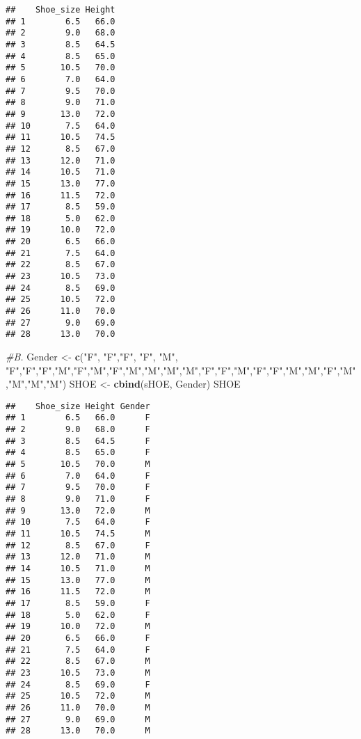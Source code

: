 \documentclass[
]{article}
\newenvironment{Shaded}{\begin{snugshade}}{\end{snugshade}}
\newcommand{\CommentTok}[1]{\textcolor[rgb]{0.56,0.35,0.01}{\textit{#1}}}
\newcommand{\FunctionTok}[1]{\textcolor[rgb]{0.13,0.29,0.53}{\textbf{#1}}}
\newcommand{\NormalTok}[1]{#1}
\newcommand{\OtherTok}[1]{\textcolor[rgb]{0.56,0.35,0.01}{#1}}
\newcommand{\StringTok}[1]{\textcolor[rgb]{0.31,0.60,0.02}{#1}}
\begin{document}
\begin{verbatim}
##    Shoe_size Height
## 1        6.5   66.0
## 2        9.0   68.0
## 3        8.5   64.5
## 4        8.5   65.0
## 5       10.5   70.0
## 6        7.0   64.0
## 7        9.5   70.0
## 8        9.0   71.0
## 9       13.0   72.0
## 10       7.5   64.0
## 11      10.5   74.5
## 12       8.5   67.0
## 13      12.0   71.0
## 14      10.5   71.0
## 15      13.0   77.0
## 16      11.5   72.0
## 17       8.5   59.0
## 18       5.0   62.0
## 19      10.0   72.0
## 20       6.5   66.0
## 21       7.5   64.0
## 22       8.5   67.0
## 23      10.5   73.0
## 24       8.5   69.0
## 25      10.5   72.0
## 26      11.0   70.0
## 27       9.0   69.0
## 28      13.0   70.0
\end{verbatim}

\begin{Shaded}
\begin{Highlighting}[]
\CommentTok{\#B.}
\NormalTok{Gender }\OtherTok{\textless{}{-}} \FunctionTok{c}\NormalTok{(}\StringTok{"F"}\NormalTok{, }\StringTok{"F"}\NormalTok{,}\StringTok{"F"}\NormalTok{, }\StringTok{"F"}\NormalTok{, }\StringTok{"M"}\NormalTok{, }\StringTok{"F"}\NormalTok{,}\StringTok{"F"}\NormalTok{,}\StringTok{"F"}\NormalTok{,}\StringTok{"M"}\NormalTok{,}\StringTok{"F"}\NormalTok{,}\StringTok{"M"}\NormalTok{,}\StringTok{"F"}\NormalTok{,}\StringTok{"M"}\NormalTok{,}\StringTok{"M"}\NormalTok{,}\StringTok{"M"}\NormalTok{,}\StringTok{"M"}\NormalTok{,}\StringTok{"F"}\NormalTok{,}\StringTok{"F"}\NormalTok{,}\StringTok{"M"}\NormalTok{,}\StringTok{"F"}\NormalTok{,}\StringTok{"F"}\NormalTok{,}\StringTok{"M"}\NormalTok{,}\StringTok{"M"}\NormalTok{,}\StringTok{"F"}\NormalTok{,}\StringTok{"M"}\NormalTok{,}\StringTok{"M"}\NormalTok{,}\StringTok{"M"}\NormalTok{,}\StringTok{"M"}\NormalTok{)}
\NormalTok{SHOE }\OtherTok{\textless{}{-}} \FunctionTok{cbind}\NormalTok{(sHOE, Gender)}
\NormalTok{SHOE}
\end{Highlighting}
\end{Shaded}

\begin{verbatim}
##    Shoe_size Height Gender
## 1        6.5   66.0      F
## 2        9.0   68.0      F
## 3        8.5   64.5      F
## 4        8.5   65.0      F
## 5       10.5   70.0      M
## 6        7.0   64.0      F
## 7        9.5   70.0      F
## 8        9.0   71.0      F
## 9       13.0   72.0      M
## 10       7.5   64.0      F
## 11      10.5   74.5      M
## 12       8.5   67.0      F
## 13      12.0   71.0      M
## 14      10.5   71.0      M
## 15      13.0   77.0      M
## 16      11.5   72.0      M
## 17       8.5   59.0      F
## 18       5.0   62.0      F
## 19      10.0   72.0      M
## 20       6.5   66.0      F
## 21       7.5   64.0      F
## 22       8.5   67.0      M
## 23      10.5   73.0      M
## 24       8.5   69.0      F
## 25      10.5   72.0      M
## 26      11.0   70.0      M
## 27       9.0   69.0      M
## 28      13.0   70.0      M
\end{verbatim}
\end{document}
